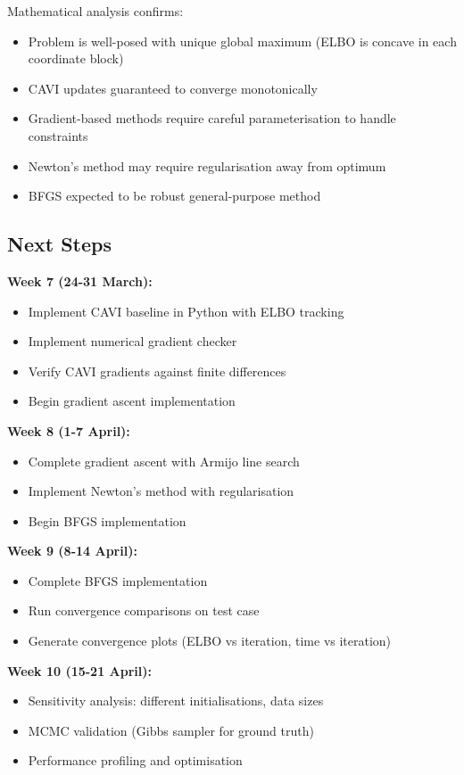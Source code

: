 \documentclass[11pt]{article}
\begin{document}
Mathematical analysis confirms:
\begin{itemize}
\item Problem is well-posed with unique global maximum (ELBO is concave in each coordinate block)
\item CAVI updates guaranteed to converge monotonically
\item Gradient-based methods require careful parameterisation to handle constraints
\item Newton's method may require regularisation away from optimum
\item BFGS expected to be robust general-purpose method
\end{itemize}

\newpage
\subsection*{Next Steps}

\textbf{Week 7 (24-31 March):}
\begin{itemize}
\item Implement CAVI baseline in Python with ELBO tracking
\item Implement numerical gradient checker
\item Verify CAVI gradients against finite differences
\item Begin gradient ascent implementation
\end{itemize}

\textbf{Week 8 (1-7 April):}
\begin{itemize}
\item Complete gradient ascent with Armijo line search
\item Implement Newton's method with regularisation
\item Begin BFGS implementation
\end{itemize}

\textbf{Week 9 (8-14 April):}
\begin{itemize}
\item Complete BFGS implementation
\item Run convergence comparisons on test case
\item Generate convergence plots (ELBO vs iteration, time vs iteration)
\end{itemize}

\textbf{Week 10 (15-21 April):}
\begin{itemize}
\item Sensitivity analysis: different initialisations, data sizes
\item MCMC validation (Gibbs sampler for ground truth)
\item Performance profiling and optimisation
\end{itemize}
\end{document}
